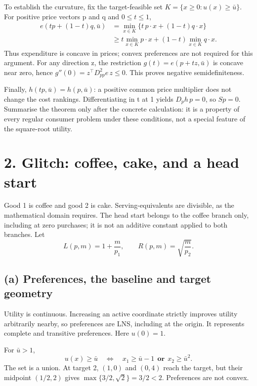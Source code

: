 \documentclass[11pt,a4paper]{article}
\begin{document}
To establish the curvature, fix the target-feasible set
$K=\{x\ge0:u(x)\ge\bar u\}$. For positive price vectors p and q and
$0\le t\le1$,
\[
\begin{aligned}
 e(tp+(1-t)q,\bar u)
 &=\min_{x\in K}\{t\,p\cdot x+(1-t)q\cdot x\}\\
 &\ge t\min_{x\in K}p\cdot x+(1-t)\min_{x\in K}q\cdot x.
\end{aligned}
\]
Thus expenditure is concave in prices; convex preferences are not required
for this argument. For any direction z, the restriction
$g(t)=e(p+tz,\bar u)$ is concave near zero, hence
$g''(0)=z^\top D^2_{pp}e\,z\le0$. This proves negative semidefiniteness.

Finally, $h(tp,\bar u)=h(p,\bar u)$: a positive common price multiplier
does not change the cost rankings. Differentiating in t at 1 yields
$D_ph\,p=0$, so $Sp=0$. Summarise the theorem only after the concrete
calculation: it is a property of every regular consumer problem under these
conditions, not a special feature of the square-root utility.

\clearpage
\section*{2. Glitch: coffee, cake, and a head start}
Good 1 is coffee and good 2 is cake. Serving-equivalents are divisible, as
the mathematical domain requires. The head start belongs to the coffee
branch only, including at zero purchases; it is not an additive constant
applied to both branches.
Let
\[
 L(p,m)=1+\frac m{p_1},\qquad R(p,m)=\sqrt{\frac m{p_2}}.
\]
\subsection*{(a) Preferences, the baseline and target geometry}
Utility is continuous. Increasing an active coordinate strictly improves
utility arbitrarily nearby, so preferences are LNS, including at the origin.
It represents complete and transitive preferences. Here $u(0)=1$.

For $\bar u>1$,
\[
 u(x)\ge\bar u\quad\Longleftrightarrow\quad
 x_1\ge\bar u-1\ \ \textbf{or}\ \ x_2\ge\bar u^2.
\]
The set is a union. At target 2, $(1,0)$ and $(0,4)$ reach the target, but
their midpoint $(1/2,2)$ gives $\max\{3/2,\sqrt2\}=3/2<2$.
Preferences are not convex.
\end{document}
